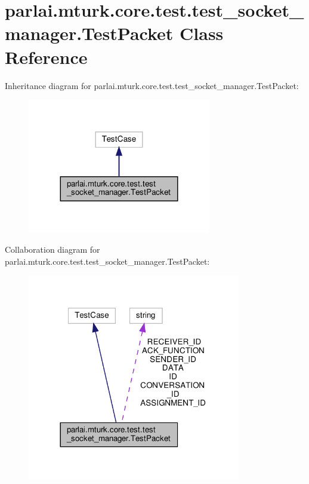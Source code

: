 \hypertarget{classparlai_1_1mturk_1_1core_1_1test_1_1test__socket__manager_1_1TestPacket}{}\section{parlai.\+mturk.\+core.\+test.\+test\+\_\+socket\+\_\+manager.\+Test\+Packet Class Reference}
\label{classparlai_1_1mturk_1_1core_1_1test_1_1test__socket__manager_1_1TestPacket}


Inheritance diagram for parlai.\+mturk.\+core.\+test.\+test\+\_\+socket\+\_\+manager.\+Test\+Packet\+:
\nopagebreak
\begin{figure}[H]
\begin{center}
\leavevmode
\includegraphics[width=227pt]{classparlai_1_1mturk_1_1core_1_1test_1_1test__socket__manager_1_1TestPacket__inherit__graph}
\end{center}
\end{figure}


Collaboration diagram for parlai.\+mturk.\+core.\+test.\+test\+\_\+socket\+\_\+manager.\+Test\+Packet\+:
\nopagebreak
\begin{figure}[H]
\begin{center}
\leavevmode
\includegraphics[width=264pt]{classparlai_1_1mturk_1_1core_1_1test_1_1test__socket__manager_1_1TestPacket__coll__graph}
\end{center}
\end{figure}

